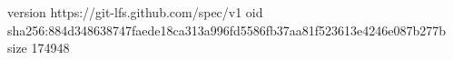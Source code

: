 version https://git-lfs.github.com/spec/v1
oid sha256:884d348638747faede18ca313a996fd5586fb37aa81f523613e4246e087b277b
size 174948

